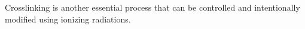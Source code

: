 Crosslinking is another essential process that can be controlled and intentionally modified using ionizing radiations\citep{priyaComprehensiveReviewHydrogel2024}. 




\begin{comment}

-------------------------------------------------

cross-linked polymer

In general, the cross-linkers increases the molecular weight of the polymer chains, which, in turn, limits their translational movement and decreases the solubility of the polymer\citep{priyaComprehensiveReviewHydrogel2024}.

Controlling the crosslinking process with ionizing radiations can be achieved by maniipulating various parameters during exposure, such as exposure time of radiaiton, frquency, temperature and pressure\citep{priyaComprehensiveReviewHydrogel2024}.




-------------------------------------------------

Hydrogels have received considerable attention in the past 50 years, due to their exceptional promise in wide range of applications [2–4]\citep{ahmedHydrogelPreparationCharacterization2015a}. 

They possess also a degree of flexibility very similar to natural tissue due to their large water content\citep{ahmedHydrogelPreparationCharacterization2015a}.

Recently, hydrogels have been defined as two- or multicomponent systems consisting of a three-dimensional network of polymer chains and water that fills the space between macromolecules\citep{ahmedHydrogelPreparationCharacterization2015a}.

Hydrogels are three-dimensional networks of hydrophilic polymers that can absorb and retain large amounts of water while maintaining their structure\footnote{Their ability to retain a large amount of water is due to their 3D structure, which gives them a gel-like appearance and behaviour.}\citep{priyaComprehensiveReviewHydrogel2024}. 

Crosslinkers play a crucial role in providing secondary interactions with biological tissues, and the presence of hydrophilic groups in the polymer chains enhances water uptake [10]\citep{priyaComprehensiveReviewHydrogel2024}. 

These methods allow researchers to create hydrogels with specific properties suitable for various applications such as tissue engineering, biomedicine, and sensing\citep{priyaComprehensiveReviewHydrogel2024}. 
The properties of hydrogels can be tailored based on the nature and arrangement of their constituent monomers, as well as the preparation method employed\citep{priyaComprehensiveReviewHydrogel2024}.



\end{comment}
